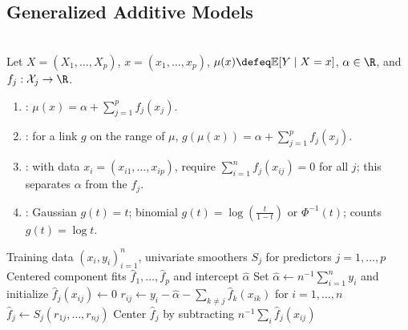 \subsection{Generalized Additive Models}

\begin{definition} \label{def:sl-generalized-additive-model} \\
Let $X=(X_1,\ldots,X_p)$, $x=(x_1,\ldots,x_p)$, $\mu(x)\defeq\mathbb{E}[Y\mid X=x]$, $\alpha\in\R$, and $f_j:\mathcal X_j\to\R$.
\begin{enumerate}[label=(\roman*)]
\setlength{\itemsep}{0pt}
\item {}: $\mu(x)=\alpha+\sum\limits_{j=1}^p f_j(x_j)$.
\item {}: for a link $g$ on the range of $\mu$, $g(\mu(x))=\alpha+\sum\limits_{j=1}^p f_j(x_j)$.
\item {}: with data $x_i=(x_{i1},\ldots,x_{ip})$, require $\sum\limits_{i=1}^n f_j(x_{ij})=0$ for all $j$; this separates $\alpha$ from the $f_j$.
\item {}: Gaussian $g(t)=t$; binomial $g(t)=\log\left(\frac{t}{1-t}\right)$ or $\Phi^{-1}(t)$; counts $g(t)=\log t$.
\end{enumerate}
\end{definition}

\begin{breakablealgorithm}
\caption{Backfitting for an Additive Regression Model}
\label{alg:sl-additive-backfitting}
\begin{algorithmic}
\Require Training data $(x_i,y_i)_{i=1}^n$, univariate smoothers $S_j$ for predictors $j=1,\ldots,p$
\Ensure Centered component fits $\widehat{f}_1,\ldots,\widehat{f}_p$ and intercept $\widehat{\alpha}$
\State Set $\widehat{\alpha}\gets n^{-1}\sum_{i=1}^ny_i$ and initialize $\widehat{f}_j(x_{ij})\gets0$
\Repeat
{}
\State $r_{ij}\gets y_i-\widehat{\alpha}-\sum_{k\neq j}\widehat{f}_k(x_{ik})$ for $i=1,\ldots,n$
\State $\widehat{f}_j\gets S_j(r_{1j},\ldots,r_{nj})$
\State Center $\widehat{f}_j$ by subtracting $n^{-1}\sum_i\widehat{f}_j(x_{ij})$
\EndFor
{}
\end{algorithmic}
\end{breakablealgorithm}

